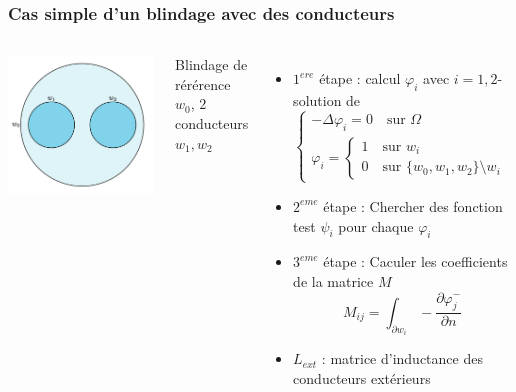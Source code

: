 \begin{frame}
\frametitle{Cas simple d'un blindage avec des conducteurs}
\begin{columns}[T]
\begin{center}
\includegraphics[scale=0.2]{figures/f3}
\end{center}
Blindage de r\'er\'erence $w_0$, $2$ conducteurs $w_1, w_2$
\begin{itemize}
\item $1^{ere}$ \'etape : calcul $\varphi_i$ avec $i=1,2$-solution de
 \begin{equation}
 \begin{cases}
 -\Delta\varphi_i = 0 \quad \text{sur } \Omega \\
 \varphi_i =  
 \begin{cases}
 1 \quad \text{sur } w_i \\
 0 \quad \text{sur } \{w_0,w_1,w_2 \} \setminus w_i
 \end{cases}
 \end{cases}
 \end{equation}
\item $2^{eme}$ \'etape : Chercher des fonction test $\psi_i$ pour chaque $\varphi_i$
\item $3^{eme}$ \'etape : Caculer les coefficients de la matrice $M$
\begin{equation}
    M_{ij} = \int_{\partial w_i} -\frac{\partial \varphi^{-}_j}{\partial n}
\end{equation}
\item $L_{ext}$ : matrice d'inductance des conducteurs ext\'erieurs  
\end{itemize}
\end{columns}
\end{frame} 


